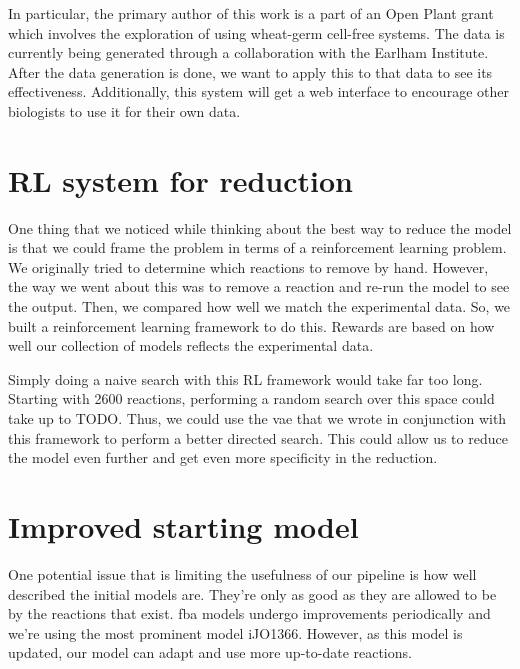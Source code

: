 In particular, the primary author of this work is a part of an Open Plant grant which involves the exploration of using wheat-germ cell-free systems.
The data is currently being generated through a collaboration with the Earlham Institute.
After the data generation is done, we want to apply this to that data to see its effectiveness.
Additionally, this system will get a web interface to encourage other biologists to use it for their own data.


\section{RL system for reduction}
One thing that we noticed while thinking about the best way to reduce the model is that we could frame the problem in terms of a reinforcement learning problem.
We originally tried to determine which reactions to remove by hand.
However, the way we went about this was to remove a reaction and re-run the model to see the output.
Then, we compared how well we match the experimental data.
So, we built a reinforcement learning framework to do this.
Rewards are based on how well our collection of models reflects the experimental data.

Simply doing a naive search with this RL framework would take far too long.
Starting with 2600 reactions, performing a random search over this space could take up to TODO.
Thus, we could use the \gls{vae} that we wrote in conjunction with this framework to perform a better directed search.
This could allow us to reduce the model even further and get even more specificity in the reduction.

\section{Improved starting model}
One potential issue that is limiting the usefulness of our pipeline is how well described the initial models are.
They're only as good as they are allowed to be by the reactions that exist.
\gls{fba} models undergo improvements periodically and we're using the most prominent model iJO1366.
However, as this model is updated, our model can adapt and use more up-to-date reactions.

